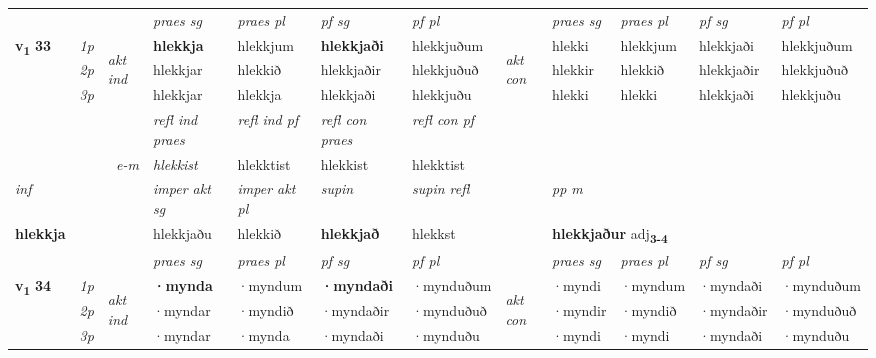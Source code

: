 \begin{longtable}[l]{X>{\footnotesize\itshape}llXXXXlXXXX}
 & &   & \textit{praes sg}  & \textit{praes pl}    & \textit{ pf sg} & \textit{pf pl} & & \textit{praes sg}  & \textit{praes pl}    & \textit{pf sg} & \textit{pf pl }  \\ \cmidrule{4-7} \cmidrule{9-12}
 \multirow{2}{*}{{{\textbf{v{\textsubscript{1}}} \Large{\textbf{33}}}}}  & 1p & \multirow{3}{*}{\begin{turn}{90}\textit{akt ind}\end{turn}} & \textbf{hlekkja} & hlekkjum & \textbf{hlekkjaði} & hlekkjuðum & \multirow{3}{*}{\begin{turn}{90}\textit{akt con}\end{turn}} &hlekki & hlekkjum & hlekkjaði & hlekkjuðum\\*
 & 2p &  &  hlekkjar  & hlekkið & hlekkjaðir & hlekkjuðuð & & hlekkir & hlekkið & hlekkjaðir & hlekkjuðuð \\*
 & 3p &  & hlekkjar & hlekkja & hlekkjaði & hlekkjuðu & & hlekki & hlekki& hlekkjaði & hlekkjuðu \\*
\cmidrule{4-7} \cmidrule{9-12}

 & && \textit{refl ind praes} & \textit{refl ind pf} & \textit{refl con praes} & \textit{refl con pf} \\*
\multicolumn{3}{r}{\textit{e-m}}& hlekkist & hlekktist & hlekkist & hlekktist \\*

\cmidrule{4-7}
   {\textit{inf}} & &  & \textit{imper akt sg} & \textit{imper akt pl}    & \textit{supin} & \textit{supin refl} && \textit{pp m} \\*
  {\textbf{hlekkja}} & && hlekkjaðu  & hlekkið    &  \textbf{hlekkjað} & hlekkst && \multicolumn{2}{l}{\textbf{hlekkjaður} adj\textbf{\textsubscript{3-4}}} \\*

\midrule

 & &   & \textit{praes sg}  & \textit{praes pl}    & \textit{ pf sg} & \textit{pf pl} & & \textit{praes sg}  & \textit{praes pl}    & \textit{pf sg} & \textit{pf pl }  \\ \cmidrule{4-7} \cmidrule{9-12}
 \multirow{2}{*}{{{\textbf{v{\textsubscript{1}}} \Large{\textbf{34}}}}}  & 1p & \multirow{3}{*}{\begin{turn}{90}\textit{akt ind}\end{turn}} & \textbf{·mynda} & ·myndum & \textbf{·myndaði} & ·mynduðum & \multirow{3}{*}{\begin{turn}{90}\textit{akt con}\end{turn}} &·myndi & ·myndum & ·myndaði & ·mynduðum\\*
 & 2p &  &  ·myndar  & ·myndið & ·myndaðir & ·mynduðuð & & ·myndir & ·myndið & ·myndaðir & ·mynduðuð \\*
 & 3p &  & ·myndar & ·mynda & ·myndaði & ·mynduðu & & ·myndi & ·myndi& ·myndaði & ·mynduðu \\*
\cmidrule{4-7} \cmidrule{9-12}


\end{longtable}

